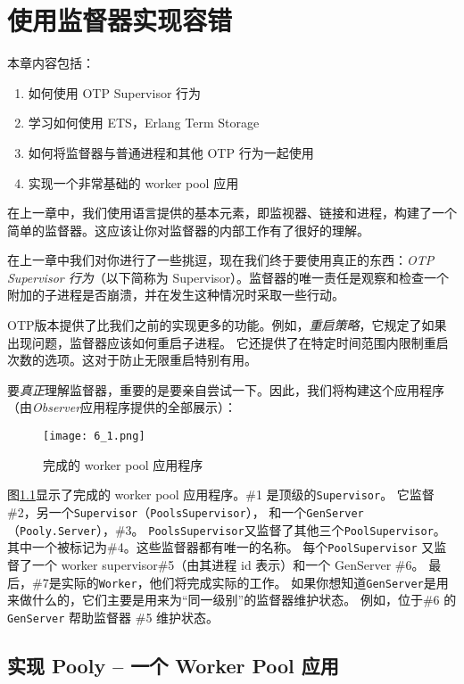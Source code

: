 \chapter{使用监督器实现容错}\label{chapt:fault-tolerent}

本章内容包括：
\begin{enumerate}
\item  如何使用 OTP Supervisor 行为
\item  学习如何使用 ETS，Erlang Term Storage
\item  如何将监督器与普通进程和其他 OTP 行为一起使用
\item  实现一个非常基础的 worker pool 应用
\end{enumerate}

在上一章中，我们使用语言提供的基本元素，即监视器、链接和进程，构建了一个简单的监督器。这应该让你对监督器的内部工作有了很好的理解。

在上一章中我们对你进行了一些挑逗，现在我们终于要使用真正的东西：\emph{OTP
Supervisor 行为}（以下简称为
Supervisor）。监督器的唯一责任是观察和检查一个附加的子进程是否崩溃，并在发生这种情况时采取一些行动。

OTP版本提供了比我们之前的实现更多的功能。例如，\emph{重启策略}，它规定了如果出现问题，监督器应该如何重启子进程。
它还提供了在特定时间范围内限制重启次数的选项。这对于防止无限重启特别有用。

要\emph{真正}理解监督器，重要的是要亲自尝试一下。因此，我们将构建这个应用程序（由\emph{Observer}应用程序提供的全部展示）：

\begin{figure}[!ht]
    \centering
    \texttt{[image: 6\_1.png]}
    \caption{完成的 worker pool 应用程序}
    \label{fig:6_1}
\end{figure}

图\ref{fig:6_1}显示了完成的 worker pool 应用程序。\#1 是顶级的\texttt{Supervisor}。
它监督 \#2，另一个\texttt{Supervisor}（\texttt{PoolsSupervisor}），
和一个\texttt{GenServer}（\texttt{Pooly.Server}），\#3。
\texttt{PoolsSupervisor}又监督了其他三个\texttt{PoolSupervisor}。
其中一个被标记为\#4。这些监督器都有唯一的名称。
每个\texttt{PoolSupervisor} 又监督了一个 worker supervisor\#5（由其进程 id 表示）和一个 GenServer \#6。
最后，\#7是实际的\texttt{Worker}，他们将完成实际的工作。
如果你想知道\texttt{GenServer}是用来做什么的，它们主要是用来为``同一级别''的监督器维护状态。
例如，位于\#6 的 \texttt{GenServer} 帮助监督器 \#5 维护状态。

\section{实现 Pooly -- 一个 Worker Pool 应用}


